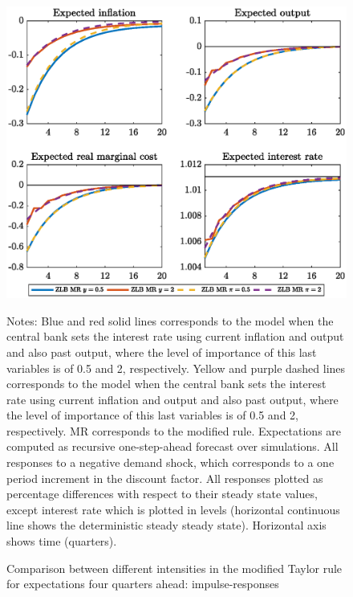 \documentclass[11pt]{article}
\numberwithin{equation}{section}
\begin{document}
\begin{figure}[H]
	\centering
	\caption{Comparison between different intensities in the modified Taylor rule for expectations four quarters ahead: impulse-responses}\label{fig:irfCompDegreeExp4_pref}
	\includegraphics[scale=.6]{irfCompDegreeExp4_pref}
	\begin{minipage}{\linewidth}
    	\vspace{1mm}
	\footnotesize{{\sc Notes:} Blue and red solid lines corresponds to the model when the central bank sets the interest rate using current inflation and output and also past output, where the level of importance of this last variables is of 0.5 and 2, respectively. Yellow and purple dashed lines corresponds to the model when the central bank sets the interest rate using current inflation and output and also past output, where the level of importance of this last variables is of 0.5 and 2, respectively. MR corresponds to the modified rule. Expectations are computed as recursive one-step-ahead forecast over simulations. All responses to a negative demand shock, which corresponds to a one period increment in the discount factor. All responses plotted as percentage differences with respect to their steady state values, except interest rate which is plotted in levels (horizontal continuous line shows the deterministic steady steady state). Horizontal axis shows time (quarters).}
	\end{minipage}
\end{figure}
\end{document}
